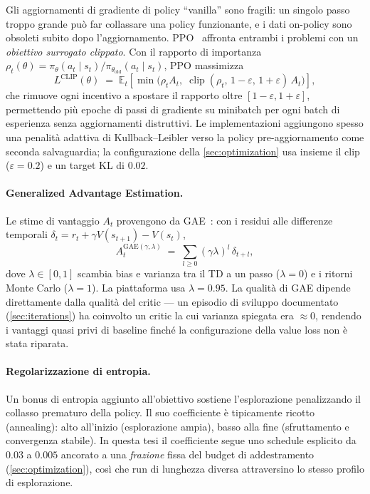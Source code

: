 Gli aggiornamenti di gradiente di policy ``vanilla'' sono fragili: un
singolo passo troppo grande può far collassare una policy funzionante, e
i dati on-policy sono obsoleti subito dopo l'aggiornamento.
PPO~\cite{schulman2017ppo} affronta entrambi i problemi con un
\emph{obiettivo surrogato clippato}. Con il rapporto di importanza
$\rho_t(\theta) = \pi_{\theta}(a_t \mid s_t) / \pi_{\theta_{\text{old}}}(a_t \mid s_t)$,
PPO massimizza
\begin{equation}
  L^{\mathrm{CLIP}}(\theta) \;=\;
  \mathbb{E}_t\!\left[\min\bigl(\rho_t A_t,\;
  \operatorname{clip}(\rho_t,\, 1-\varepsilon,\, 1+\varepsilon)\, A_t\bigr)\right],
\end{equation}
che rimuove ogni incentivo a spostare il rapporto oltre
$[1-\varepsilon, 1+\varepsilon]$, permettendo più epoche di passi di
gradiente su minibatch per ogni batch di esperienza senza aggiornamenti
distruttivi. Le implementazioni aggiungono spesso una penalità adattiva
di Kullback--Leibler verso la policy pre-aggiornamento come seconda
salvaguardia; la configurazione della \cref{sec:optimization} usa
insieme il clip ($\varepsilon = 0.2$) e un target KL di $0.02$.

\paragraph{Generalized Advantage Estimation.}
Le stime di vantaggio $A_t$ provengono da GAE~\cite{schulman2016gae}:
con i residui alle differenze temporali
$\delta_t = r_t + \gamma V(s_{t+1}) - V(s_t)$,
\begin{equation}
  A_t^{\mathrm{GAE}(\gamma,\lambda)} \;=\;
  \sum_{l \geq 0} (\gamma\lambda)^{l}\, \delta_{t+l},
\end{equation}
dove $\lambda \in [0,1]$ scambia bias e varianza tra il TD a un passo
($\lambda = 0$) e i ritorni Monte Carlo ($\lambda = 1$). La piattaforma
usa $\lambda = 0.95$. La qualità di GAE dipende direttamente dalla
qualità del critic --- un episodio di sviluppo documentato
(\cref{sec:iterations}) ha coinvolto un critic la cui varianza spiegata
era $\approx 0$, rendendo i vantaggi quasi privi di baseline finché la
configurazione della value loss non è stata riparata.

\paragraph{Regolarizzazione di entropia.}
Un bonus di entropia aggiunto all'obiettivo sostiene l'esplorazione
penalizzando il collasso prematuro della policy. Il suo coefficiente è
tipicamente ricotto (annealing): alto all'inizio (esplorazione ampia),
basso alla fine (sfruttamento e convergenza stabile). In questa tesi il
coefficiente segue uno schedule esplicito da $0.03$ a $0.005$ ancorato a
una \emph{frazione} fissa del budget di addestramento
(\cref{sec:optimization}), così che run di lunghezza diversa attraversino
lo stesso profilo di esplorazione.

